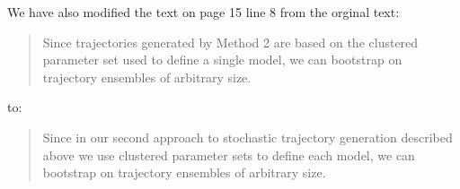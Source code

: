 \documentclass{article}
\begin{document}
\begin{enumerate}[label={Comment \theenumi :}, leftmargin=3.9\parindent]
    We have also modified the text on page 15 line 8 from the orginal text:
    \begin{quote}
    Since trajectories generated by Method 2 are based on the clustered parameter set used to define a
    single model, we can bootstrap on trajectory ensembles of arbitrary size.
    \end{quote}
    to:
    \begin{quote}
    Since in our second approach to stochastic trajectory generation described above we use clustered 
    parameter sets to define each model, we can bootstrap on trajectory ensembles of arbitrary size.
    \end{quote}

\end{enumerate}



\end{document}
